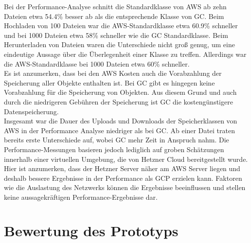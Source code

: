 Bei der Performance-Analyse schnitt die Standardklasse von AWS ab zehn Dateien etwa 54.4\% besser ab als die entsprechende Klasse von GC. Beim Hochladen von 100 Dateien war die AWS-Standardklasse etwa 60.9\% schneller und bei 1000 Dateien etwa 58\% schneller wie die GC Standardklasse. Beim Herunterladen von Dateien waren die Unterschiede nicht groß genug, um eine eindeutige Aussage über die Überlegenheit einer Klasse zu treffen. Allerdings war die AWS-Standardklasse bei 1000 Dateien etwa 60\% schneller.\\

Es ist anzumerken, dass bei den AWS Kosten auch die Vorabzahlung der Speicherung aller Objekte enthalten ist. Bei GC gibt es hingegen keine Vorabzahlung für die Speicherung von Objekten. Aus diesem Grund und auch durch die niedrigeren Gebühren der Speicherung ist GC die kostengünstigere Datenspeicherung.\\

Insgesamt war die Dauer des Uploads und Downloads der Speicherklassen von AWS in der Performance Analyse niedriger als bei GC. Ab einer Datei traten bereits erste Unterschiede auf, wobei GC mehr Zeit in Anspruch nahm. Die Performance-Messungen basieren jedoch lediglich auf groben Schätzungen innerhalb einer virtuellen Umgebung, die von Hetzner Cloud bereitgestellt wurde. Hier ist anzumerken, dass der Hetzner Server näher am AWS Server liegen und deshalb bessere Ergebnisse in der Performance als GCP erzielen kann. Faktoren wie die Auslastung des Netzwerks können die Ergebnisse beeinflussen und stellen keine aussagekräftigen Performance-Ergebnisse dar.\\

\section{Bewertung des Prototyps}

